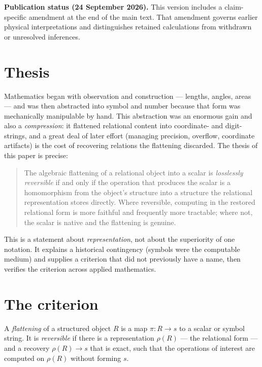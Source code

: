 \documentclass[11pt]{article}
\begin{document}
\par\smallskip\noindent\textbf{Publication status (24 September 2026).}
This version includes a claim-specific amendment at the end of the main text.
That amendment governs earlier physical interpretations and distinguishes
retained calculations from withdrawn or unresolved inferences.\par\smallskip


\section{Thesis}

Mathematics began with observation and construction --- lengths, angles, areas --- and was then abstracted
into symbol and number because that form was mechanically manipulable by hand. This abstraction was an
enormous gain and also a \emph{compression}: it flattened relational content into coordinate- and
digit-strings, and a great deal of later effort (managing precision, overflow, coordinate artifacts) is the
cost of recovering relations the flattening discarded. The thesis of this paper is precise:

\begin{quote}
The algebraic flattening of a relational object into a scalar is \emph{losslessly reversible} if and only if
the operation that produces the scalar is a homomorphism from the object's structure into a structure the
relational representation stores directly. Where reversible, computing in the restored relational form is
more faithful and frequently more tractable; where not, the scalar is native and the flattening is genuine.
\end{quote}

This is a statement about \emph{representation}, not about the superiority of one notation. It explains a
historical contingency (symbols were the computable medium) and supplies a criterion that did not previously
have a name, then verifies the criterion across applied mathematics.

\section{The criterion}

\begin{definition}
A \emph{flattening} of a structured object $R$ is a map $\pi:R\to s$ to a scalar or symbol string. It is
\emph{reversible} if there is a representation $\rho(R)$ --- the relational form --- and a recovery
$\rho(R)\to s$ that is exact, such that the operations of interest are computed on $\rho(R)$ without forming
$s$.
\end{definition}
\end{document}
